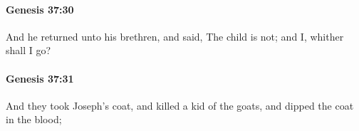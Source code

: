 		\paragraph{Genesis 37:30} %
			\label{GENESIS-37-30}

			And he returned unto his brethren, and said, The child is not; and I, whither shall I go?


		\paragraph{Genesis 37:31} %
			\label{GENESIS-37-31}

			And they took Joseph's coat, and killed a kid of the goats, and dipped the coat in the blood;


